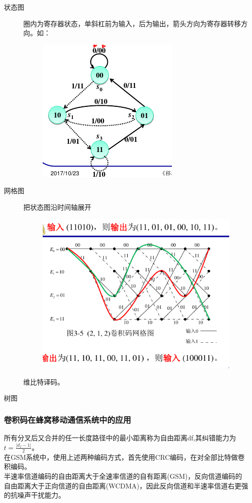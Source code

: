 \begin{description}
	\item[状态图] 圈内为寄存器状态，单斜杠前为输入，后为输出，箭头方向为寄存器转移方向。如：
	\begin{figure}[H]
		\centering
		\includegraphics[width=0.7\linewidth]{figures/状态转移图}
		\caption{}
		\label{fig:}
	\end{figure}
	\item[网格图] 把状态图沿时间轴展开
	\begin{figure}[H]
		\centering
		\includegraphics[width=0.7\linewidth]{figures/网格图}
		\caption{}
		\label{fig:}
	\end{figure}
	维比特译码。
	\item [树图]
\end{description}
\subsubsection{卷积码在蜂窝移动通信系统中的应用}
所有分叉后又合并的任一长度路径中的最小距离称为自由距离df,其纠错能力为$ t = \frac{|d_f -1 |}{2} $。\\
在GSM系统中，使用上述两种编码方式，首先使用CRC编码，在对全部比特做卷积编码。\\
半速率信道编码的自由距离大于全速率信道的自有距离(GSM)，反向信道编码的自由距离大于正向信道的自由距离(WCDMA)，因此反向信道和半速率信道右更强的抗噪声干扰能力。
